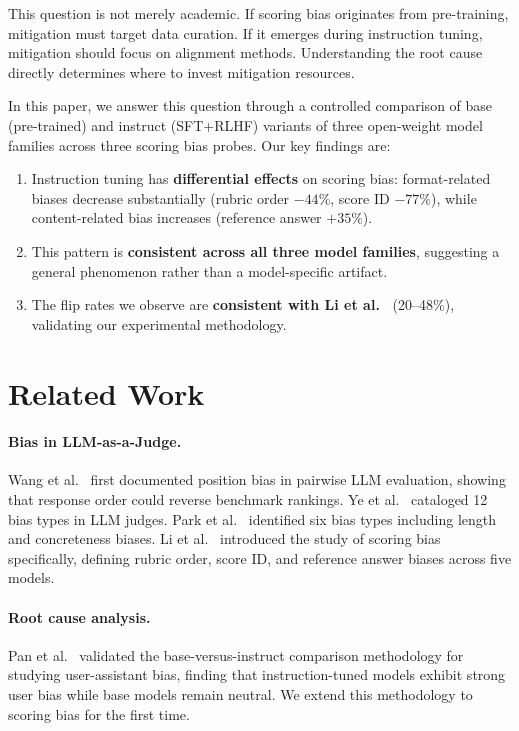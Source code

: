 \documentclass[11pt]{article}
\begin{document}
This question is not merely academic. If scoring bias originates from pre-training, mitigation must target data curation. If it emerges during instruction tuning, mitigation should focus on alignment methods. Understanding the root cause directly determines where to invest mitigation resources.

In this paper, we answer this question through a controlled comparison of base (pre-trained) and instruct (SFT+RLHF) variants of three open-weight model families across three scoring bias probes. Our key findings are:

\begin{enumerate}
    \item Instruction tuning has \textbf{differential effects} on scoring bias: format-related biases decrease substantially (rubric order $-44\%$, score ID $-77\%$), while content-related bias increases (reference answer $+35\%$).
    \item This pattern is \textbf{consistent across all three model families}, suggesting a general phenomenon rather than a model-specific artifact.
    \item The flip rates we observe are \textbf{consistent with Li et al.~\cite{li2025scoring}} (20--48\%), validating our experimental methodology.
\end{enumerate}

\section{Related Work}

\paragraph{Bias in LLM-as-a-Judge.} Wang et al.~\cite{wang2023large} first documented position bias in pairwise LLM evaluation, showing that response order could reverse benchmark rankings. Ye et al.~\cite{ye2024justice} cataloged 12 bias types in LLM judges. Park et al.~\cite{park2024offsetbias} identified six bias types including length and concreteness biases. Li et al.~\cite{li2025scoring} introduced the study of scoring bias specifically, defining rubric order, score ID, and reference answer biases across five models.

\paragraph{Root cause analysis.} Pan et al.~\cite{pan2025user} validated the base-versus-instruct comparison methodology for studying user-assistant bias, finding that instruction-tuned models exhibit strong user bias while base models remain neutral. We extend this methodology to scoring bias for the first time.
\end{document}
